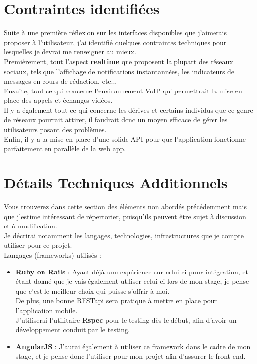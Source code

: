 \documentclass[a4paper,10pt,final,fleqn]{article}
\begin{document}
	\section{Contraintes identifiées}

		Suite à une première réflexion sur les interfaces disponibles que j'aimerais proposer à l'utilisateur, j'ai identifié quelques contraintes techniques pour lesquelles je devrai me renseigner au mieux.\\

		Premièrement, tout l'aspect \textbf{realtime} que proposent la plupart des réseaux sociaux, tels que l'affichage de notifications instantannées, les indicateurs de messages en cours de rédaction, etc...\\

		Ensuite, tout ce qui concerne l'environnement VoIP qui permettrait la mise en place des appels et échanges vidéos.\\

		Il y a également tout ce qui concerne les dérives et certains individus que ce genre de réseaux pourrait attirer, il faudrait donc un moyen efficace de gérer les utilisateurs posant des problèmes.\\

		Enfin, il y a la mise en place d'une solide API pour que l'application fonctionne parfaitement en parallèle de la web app.\\
					
	\section{Détails Techniques Additionnels}

		Vous trouverez dans cette section des éléments non abordés précédemment mais que j'estime intéressant de répertorier, puisqu'ils peuvent être sujet à discussion et à modification.\\
		Je décrirai notamment les langages, technologies, infrastructures que je compte utiliser pour ce projet.\\

		Langages (frameworks) utilisés : \\

		\begin{itemize}
			\item \textbf{Ruby on Rails} : Ayant déjà une expérience sur celui-ci pour intégration, et étant donné que je vais également utiliser celui-ci lors de mon stage, je pense que c'est le meilleur choix qui puisse s'offrir à moi.\\
			De plus, une bonne RESTapi sera pratique à mettre en place pour l'application mobile.\\
			J'utiliserai l'utilitaire \textbf{Rspec} pour le testing dès le début, afin d'avoir un développement conduit par le testing.\\

			\item \textbf{AngularJS} : J'aurai également à utiliser ce framework dans le cadre de mon stage, et je pense donc l'utiliser pour mon projet afin d'assurer le front-end.\\

		\end{itemize}
\end{document}

